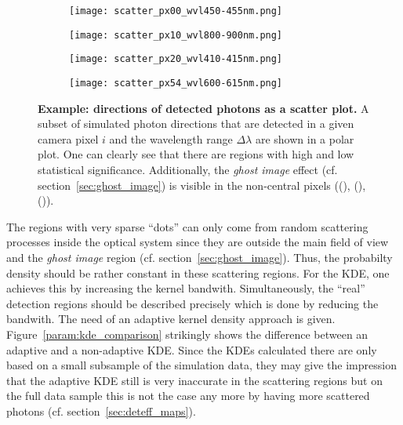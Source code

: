 \begin{figure}[H]
	\centering
	\begin{subfigure}[t]{0.49\textwidth}
		\texttt{[image: scatter\_px00\_wvl450-455nm.png]}
		\subcaption{}
		\label{param:example_scatter:1}
	\end{subfigure}
	\hfill
	\begin{subfigure}[t]{0.49\textwidth}
		\texttt{[image: scatter\_px10\_wvl800-900nm.png]}
		\subcaption{}
		\label{param:example_scatter:2}
	\end{subfigure}
	\vfill
	\begin{subfigure}[b]{0.49\textwidth}
		\texttt{[image: scatter\_px20\_wvl410-415nm.png]}
		\subcaption{}
		\label{param:example_scatter:3}
	\end{subfigure}
	\hfill
	\begin{subfigure}[b]{0.49\textwidth}
		\texttt{[image: scatter\_px54\_wvl600-615nm.png]}
		\subcaption{}
		\label{param:example_scatter:4}
	\end{subfigure}
	\caption[Example: directions of detected photons as a scatter plot]{\textbf{Example: directions of detected photons as a scatter plot.} A subset of simulated photon directions that are detected in a given camera pixel $i$ and the wavelength range $\Delta\lambda$ are shown in a polar plot. One can clearly see that there are regions with high and low statistical significance. Additionally, the \textit{ghost image} effect (cf. section~\ref{sec:ghost_image}) is visible in the non-central pixels ((), (), ()).}
	\label{param:example_scatter}	
\end{figure}

The regions with very sparse \enquote{dots} can only come from random scattering processes inside the optical system since they are outside the main field of view and the \textit{ghost image} region (cf. section~\ref{sec:ghost_image}). Thus, the probabilty density should be rather constant in these scattering regions. For the KDE, one achieves this by increasing the kernel bandwith. Simultaneously, the \enquote{real} detection regions should be described precisely which is done by reducing the bandwith. The need of an adaptive kernel density approach is given. Figure~\ref{param:kde_comparison} strikingly shows the difference between an adaptive and a non-adaptive KDE. Since the KDEs calculated there are only based on a small subsample of the simulation data, they may give the impression that the adaptive KDE still is very inaccurate in the scattering regions but on the full data sample this is not the case any more by having more scattered photons (cf. section~\ref{sec:deteff_maps}).

